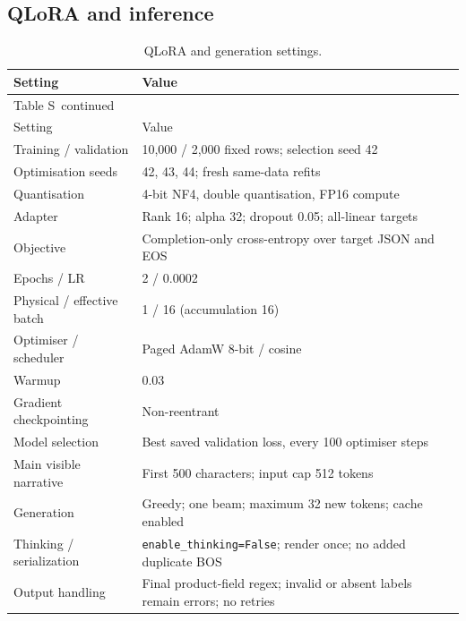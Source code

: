 \documentclass[10pt,a4paper]{article}
\renewcommand{\thetable}{S\arabic{table}}
\begin{document}
\clearpage
\subsection{QLoRA and inference}


{\small
\setlength{\tabcolsep}{4pt}
\begin{longtable}{@{}p{43mm}p{114mm}@{}}
\caption{QLoRA and generation settings.}\label{sup:qlora}\\
\toprule
Setting & Value \\
\midrule\endfirsthead
\multicolumn{2}{l}{\small Table \thetable\ continued}\\
\toprule
Setting & Value \\
\midrule\endhead
\bottomrule\endfoot
Training / validation & 10,000 / 2,000 fixed rows; selection seed 42 \\
Optimisation seeds & 42, 43, 44; fresh same-data refits \\
Quantisation & 4-bit NF4, double quantisation, FP16 compute \\
Adapter & Rank 16; alpha 32; dropout 0.05; all-linear targets \\
Objective & Completion-only cross-entropy over target JSON and EOS \\
Epochs / LR & 2 / 0.0002 \\
Physical / effective batch & 1 / 16 (accumulation 16) \\
Optimiser / scheduler & Paged AdamW 8-bit / cosine \\
Warmup & 0.03 \\
Gradient checkpointing & Non-reentrant \\
Model selection & Best saved validation loss, every 100 optimiser steps \\
Main visible narrative & First 500 characters; input cap 512 tokens \\
Generation & Greedy; one beam; maximum 32 new tokens; cache enabled \\
Thinking / serialization & \texttt{enable\_thinking=False}; render once; no added duplicate BOS \\
Output handling & Final product-field regex; invalid or absent labels remain errors; no retries \\
\end{longtable}
}
\end{document}
